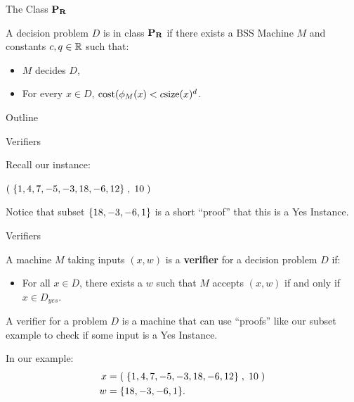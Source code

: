 \documentclass[c]{beamer}
\begin{document}
\begin{frame}{The Class $\mathbf{P_R}$}
  
  A decision problem $D$ is in class $\mathbf{P_R}$ if there exists a BSS
  Machine $M$ and constants $c, q \in \mathbb{R}$ such that:
  \begin{itemize}
  \item $M$ decides $D$,
  \item For every $x \in D$, $\text{cost}(\phi_M(x) < c \text{size}(x)^d$.
  \end{itemize}
  
\end{frame}

\begin{frame}{Outline}
  \begin{center}
    \scaletopagewidth{\outlinefinal}
  \end{center}
\end{frame}

\begin{frame}{Verifiers}

  Recall our \subsum{} instance:

  \vspace{\baselineskip}

  $(\;\{1,4,7,-5,-3,18,-6,12\}\;, \;10\;)$

  \vspace{\baselineskip}

  Notice that subset $\{18, -3, -6, 1\}$ is a short ``proof'' that
  this is a Yes Instance.

  \vspace{\baselineskip}

\end{frame}

\begin{frame}{Verifiers}

  A machine $M$ taking inputs $(x, w)$ is a \textbf{verifier} for a decision
  problem $D$ if:

  \begin{itemize}
  \item[] For all $x \in D$, there exists a $w$ such that $M$ accepts
    $(x, w)$ if and only if $x \in D_{yes}$.
  \end{itemize}\pause

  A verifier for a problem $D$ is a machine that can use ``proofs''
  like our subset example to check if some input is a Yes
  Instance.\pause

  \vspace{\baselineskip}

  In our example: 
  \begin{align*}
    x &= (\;\{1,4,7,-5,-3,18,-6,12\}\;, \;10\;) \\
    w &= \{18, -3, -6,1\}.
  \end{align*}
\end{frame}
\end{document}
